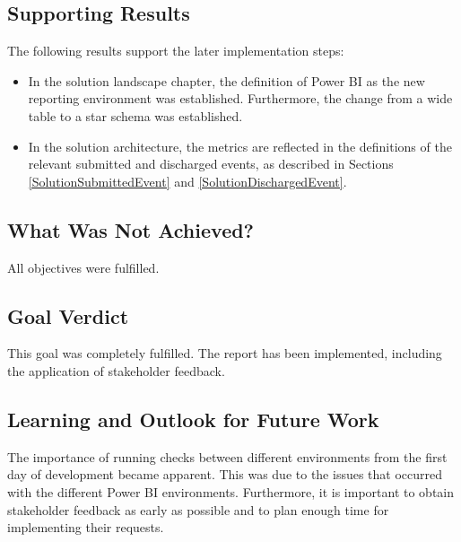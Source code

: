\subsection*{Supporting Results}

The following results support the later implementation steps:

\begin{itemize}
    \item In the solution landscape chapter, the definition of Power BI as the new reporting environment was established. Furthermore, the change from a wide table to a star schema was established.

    \item In the solution architecture, the metrics are reflected in the definitions of the relevant submitted and discharged events, as described in Sections \ref{SolutionSubmittedEvent} and \ref{SolutionDischargedEvent}.
\end{itemize}

\subsection*{What Was Not Achieved?}

All objectives were fulfilled.

\subsection*{Goal Verdict}

This goal was completely fulfilled. The report has been implemented, including the application of stakeholder feedback.

\subsection*{Learning and Outlook for Future Work}

The importance of running checks between different environments from the first day of development became apparent. This was due to the issues that occurred with the different Power BI environments. Furthermore, it is important to obtain stakeholder feedback as early as possible and to plan enough time for implementing their requests.